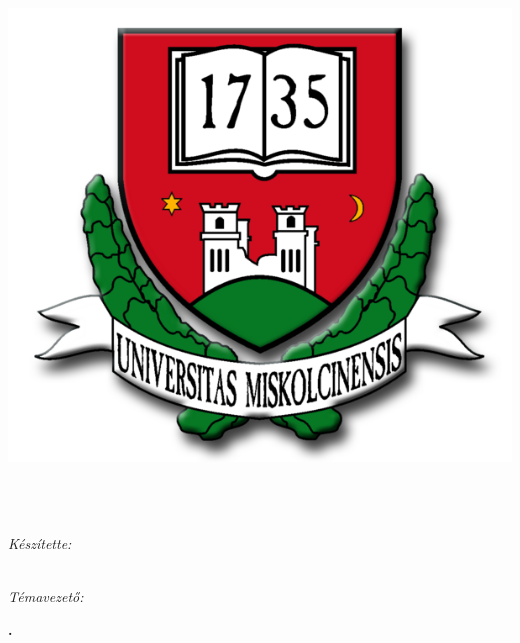 \documentclass[11pt, a4paper, oneside]{Thesis} %
\begin{document}

\begin{titlepage}
\begin{flushleft}
\Large{
\univname\\
\instname\\
\deptname
}
\end{flushleft}
\begin{center}


\vspace{1cm}

\includegraphics[width=0.4\linewidth]{./figures/miskolc_logo}

\vspace{1cm}

{\huge \bfseries \ttitle}\\[0.4cm] %

\textsc{\Large \degreename}\\[0.5cm] %
 
 \vspace{4.6cm}

\textit{Készítette:}\\
\authornames\\
\textsc{\authorId}
 
\vspace{2cm}

\textit{Témavezető:}\\
\supname

\vspace{2cm}

\textbf{\the\year.}
 
\vfill
\end{center}

\end{titlepage}

\end{document}
